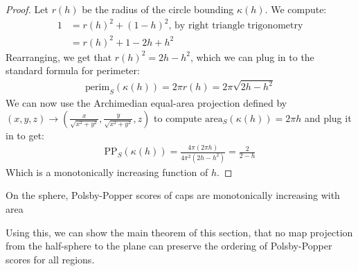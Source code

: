 \begin{proof}
  Let $r(h)$ be the radius of the circle bounding $\kappa(h)$. We
  compute: 
  \begin{align*}
    1 &= r(h)^2 + (1-h)^2 \text {, by right triangle trigonometry}\\ 
      &= r(h)^2 + 1 - 2h+h^2
  \end{align*}
  Rearranging, we get that $r(h)^2= 2h-h^2$, which we can plug in to
  the standard formula for perimeter:
  \begin{align*}
    \mathrm{perim}_S(\kappa(h)) = 2\pi r(h) = 2\pi \sqrt{2h-h^2}
  \end{align*}
  We can now use the Archimedian equal-area projection 
  defined by $(x,y,z) \to
  \left(\frac{x}{\sqrt{x^2+y^2}},\frac{y}{\sqrt{x^2+y^2}}, z\right)$ 
  to compute $\mathrm{area}_S(\kappa(h)) = 2\pi h$ and plug it in to 
  get:
  \begin{align*}
    \mathrm{PP}_S(\kappa(h)) = \frac{4\pi (2\pi h) }{4 \pi^2 (2h-h^2)}
    = \frac{2}{2-h}
  \end{align*}
  Which is a monotonically increasing function of $h$.
\end{proof}
\begin{corollary}\label{cor:capscale}
  On the sphere, Polsby-Popper scores of caps are monotonically
  increasing with area
\end{corollary}
Using this, we can show the main theorem of this section, that no map
projection from the half-sphere to the plane can preserve the ordering
of Polsby-Popper scores for all regions.  


